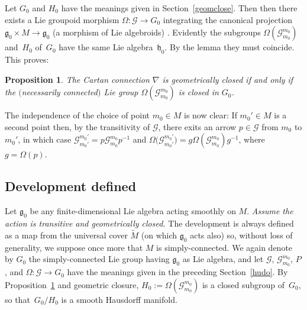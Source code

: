 \documentclass[pdftex]{sigma}
\numberwithin{equation}{section}
\newtheorem{PropositionBlaom}[TheoremBlaom]{Proposition}
 { \theoremstyle{definition}
\newtheorem{CounterexampleBlaom}[TheoremBlaom]{Counterexample}
\newtheorem{RemarkBlaom}[TheoremBlaom]{Remark} }
\begin{document}
Let $G_0$ and $H_0$ have the meanings given in Section~\ref{geomclose}. Then
then there exists a Lie groupoid morphism $\Omega \colon {\mathcal G}
\rightarrow G_0$ integrating the canonical projection ${\mathfrak g}_0
\times M \rightarrow {\mathfrak g}_0$ (a morphism of Lie algebroids)
\cite[Lie~II]{Crainic_Fernandes_11}. Evidently the subgroups
$\Omega({\mathcal G}_{m_0}^{m_0})$ and~$H_0$ of~$G_0$ have the same
Lie algebra~${\mathfrak h}_0$. By the lemma they must coincide. This
proves:
\begin{PropositionBlaom}\label{Proposition4.2}
  The Cartan connection $\nabla$ is geometrically closed if and only
  if the $($necessarily connected$)$ Lie group $\Omega({\mathcal
    G}^{m_0}_{m_0})$ is closed in $G_0$.
\end{PropositionBlaom}

The independence of the choice of point $m_0 \in M$ is now clear: If
$m_0' \in M$ is a second point then, by the transitivity of ${\mathcal
  G} $, there exits an arrow $p \in {\mathcal G} $ from $m_0$ to
$m_0'$, in which case ${\mathcal G}^{m_0'}_{m_0'}=p {\mathcal
  G}^{m_0}_{m_0} p^{-1}$ and $\Omega\big({\mathcal G}^{m_0'}_{m_0'}\big)=g
\Omega({\mathcal G}^{m_0}_{m_0})g^{-1}$, where $g=\Omega(p)$.

\subsection{Development def\/ined}\label{devmap}
Let ${\mathfrak g}_0$ be any f\/inite-dimensional Lie algebra acting
smoothly on $M$.  {\em Assume the action is transitive and
  geometrically closed.}  The development is always def\/ined as a map
from the universal cover $\tilde M$ (on which ${\mathfrak g}_0$ acts
also) so, without loss of generality, we suppose once more that $M$ is
simply-connected. We again denote by $G_0$ the simply-connected Lie
group having ${\mathfrak g}_0 $ as Lie algebra, and let ${\mathcal
  G}$, ${\mathcal G}^{m_0}_{m_0}$, $P$, and $\Omega \colon {\mathcal
  G} \rightarrow G_0$ have the meanings given in the preceding
Section~\ref{hudo}. By Proposition~\ref{Proposition4.2} %
and geometric closure,
$H_0:=\Omega({\mathcal G}^{m_0}_{m_0})$ is a closed subgroup of~$G_0$,
so that~$G_0/H_0$ is a smooth Hausdorf\/f manifold.
\end{document}
